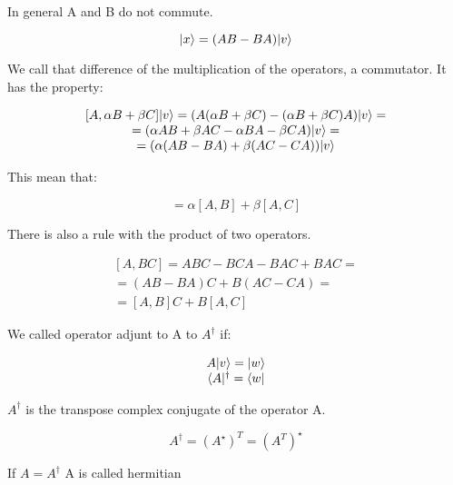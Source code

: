 In general A and B do not commute.

\begin{equation}
  \lvert x\rangle = (AB-BA) \lvert v\rangle
\end{equation}

We call that difference of the multiplication of the operators, a commutator. It has the property:

\begin{equation}
  \begin{array}{c}
    [A,\alpha B + \beta C]\lvert v\rangle = (A(\alpha B+\beta C)-(\alpha B + \beta C)A)\lvert v\rangle =
    \\
    = (\alpha AB+\beta AC-\alpha BA - \beta CA) \lvert v\rangle =
    \\
    = (\alpha (AB-BA)+\beta(AC-CA)) \lvert v\rangle
  \end{array}
\end{equation}

This mean that:

\begin{equation}
    [A,\alpha B + \beta C] = \alpha [A,B] + \beta[A,C]
\end{equation}

There is also a rule with the product of two operators.

\begin{equation}
  \begin{array}{c}
    [A,BC] = ABC - BCA - BAC + BAC =
    \\
    = (AB-BA)C + B(AC-CA) =
    \\
    = [A,B]C + B[A,C]
  \end{array}
\end{equation}

We called operator adjunt to A to $A^{\dagger}$ if:

\begin{equation}
  \begin{array}{c}
    A \lvert v\rangle = \lvert w\rangle
    \\
    \langle A\rvert^{\dagger} = \langle w\rvert
  \end{array}
\end{equation}

$A^{\dagger}$ is the transpose complex conjugate of the operator A.

\begin{equation}
  A^{\dagger} = (A^{\star})^{T} = (A^{T})^{\star}
\end{equation}

If $A=A^{\dagger}$ A is called hermitian


